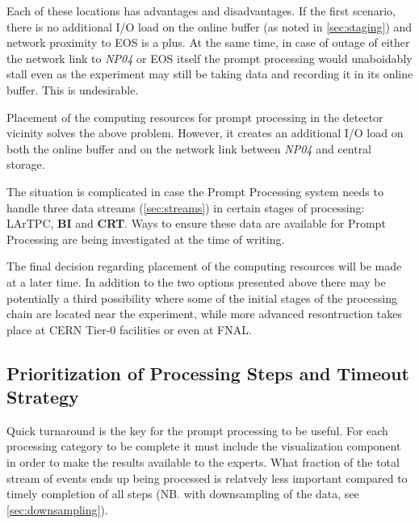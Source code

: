 \documentclass[pdftex,12pt,letter]{article}
\newcommand{\expname}{\textit{NP04}\xspace}
\newcommand{\PP}{Prompt Processing\xspace}
\begin{document}
\noindent Each of these locations has advantages and disadvantages. If the first scenario,
there is no additional I/O load on the online buffer (as noted in \ref{sec:staging}) and network proximity
to EOS is a plus. At the same time, in case of outage of either the network link to \expname or EOS itself
the prompt processing would unaboidably stall even as the experiment may still be taking data and recording
it in its online buffer. This is undesirable.

Placement of the computing resources for prompt processing in the detector
vicinity solves the above problem. However, it creates an additional I/O load on both
the online buffer and on the network link between \expname and central storage.

The situation is complicated in case the \PP system needs to handle three data streams (\ref{sec:streams})
in certain stages of processing: LArTPC, \textbf{BI} and \textbf{CRT}. Ways to ensure these
data are available for \PP are being investigated at the time of writing.

The final decision regarding placement of the computing resources will be made at a later time.
In addition to the two options presented above there may be potentially a third possibility where
some of the initial stages of the processing chain are located near the experiment, while more
advanced resontruction takes place at CERN Tier-0 facilities or even at FNAL.


\subsection{Prioritization of Processing Steps and Timeout Strategy}
\label{sec:priority}
Quick turnaround is the key for the prompt processing to be useful. For each processing category
to be complete it must include the visualization component in order to make the results available
to the experts. What fraction of the total stream of events ends up being processed is relatvely less
important compared to timely completion of all steps (NB. with downsampling of the data, see 
\ref{sec:downsampling}).
\end{document}
